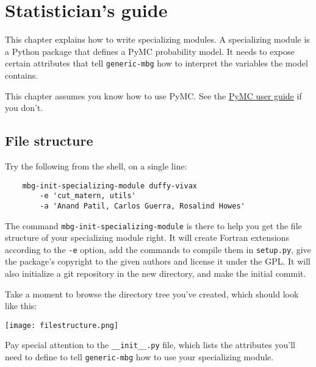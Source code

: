 % 

\chapter{Statistician's guide} 
\label{chap:stat}

This chapter explains how to write specializing modules. A specializing module is a Python package that defines a PyMC probability model. It needs to expose certain attributes that tell \texttt{generic-mbg} how to interpret the variables the model contains.

This chapter assumes you know how to use PyMC. See the \href{http://code.google.com/p/pymc/}{PyMC user guide} if you don't.




\section{File structure} 
Try the following from the shell, on a single line:
\begin{verbatim}
    mbg-init-specializing-module duffy-vivax 
        -e 'cut_matern, utils' 
        -a 'Anand Patil, Carlos Guerra, Rosalind Howes'
\end{verbatim}
The command \texttt{mbg-init-specializing-module} is there to help you get the file structure of your specializing module right. It will create Fortran extensions according to the \texttt{-e} option, add the commands to compile them in \texttt{setup.py}, give the package's copyright to the given authors and license it under the GPL. It will also initialize a git repository in the new directory, and make the initial commit.


Take a moment to browse the directory tree you've created, which should look like this:
\begin{center}
\texttt{[image: filestructure.png]}     
\end{center}
Pay special attention to the \texttt{\_\_init\_\_.py} file, which lists the attributes you'll need to define to tell \texttt{generic-mbg} how to use your specializing module.

